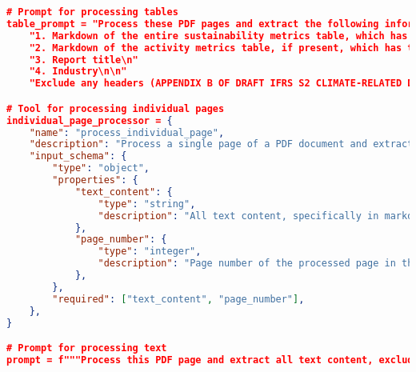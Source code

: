 \begin{appendices}
\begin{lstlisting}[language=json,firstnumber=1,label={lst:pdf_parse_prompt},caption={Schemas and prompts for PDF table and text extraction}]
# Prompt for processing tables
table_prompt = "Process these PDF pages and extract the following information:\n"
    "1. Markdown of the entire sustainability metrics table, which has these five columns: TOPIC, METRIC, CATEGORY, UNIT OF MEASURE, CODE (make sure to exclude any text that has been crossed out, but include any underlined text!)\n"
    "2. Markdown of the activity metrics table, if present, which has these four columns: ACTIVITY METRIC, CATEGORY, UNIT OF MEASURE, CODE (make sure to exclude any text that has been crossed out, but include any underlined text!). If there is no activity metrics table, omit this field.\n"
    "3. Report title\n"
    "4. Industry\n\n"
    "Exclude any headers (APPENDIX B OF DRAFT IFRS S2 CLIMATE-RELATED DISCLOSURES) or (EXPOSURE DRAFT MARCH 2022) and footers (2022 SASB, part of Value Reporting Foundation. All rights reserved.) of the pages, but include footnotes. Exclude any instances of 'continued...' or '...continued'. Exclude any text that has been crossed out, but include any underlined text. Note that tables may continue across pages. Provide the output in the specified schema."

# Tool for processing individual pages
individual_page_processor = {
    "name": "process_individual_page",
    "description": "Process a single page of a PDF document and extract specified information",
    "input_schema": {
        "type": "object",
        "properties": {
            "text_content": {
                "type": "string",
                "description": "All text content, specifically in markdown format, excluding the tables Table 1. Sustainability Disclosure Topics & Metrics and Table 2. Activity Metrics." ,
            },
            "page_number": {
                "type": "integer",
                "description": "Page number of the processed page in the footer",
            },
        },
        "required": ["text_content", "page_number"],
    },
}

# Prompt for processing text
prompt = f"""Process this PDF page and extract all text content, excluding the tables Table 1. Sustainability Disclosure Topics & Metrics and Table 2. Activity Metrics, but including any other tables that appear. Exclude any text that has been crossed out, but include any underlined text. Exclude any headers (APPENDIX B OF DRAFT IFRS S2 CLIMATE-RELATED DISCLOSURES) or (EXPOSURE DRAFT MARCH 2022) and footers (2022 SASB, part of Value Reporting Foundation. All rights reserved.) of the pages, but include footnotes. Exclude the section header titled 'Sustainability Disclosure Topics & Metrics'. Exclude subsections 'Table 1. Sustainability Disclosure Topics & Metrics' and 'Table 2. Activity Metrics'. Exclude any instances of 'continued...' or '...continued'. The report title is '{report_title}', the industry is '{industry}' (but DO NOT include the report title and industry as sections in the markdown). Provide the output in the specified schema."""


\end{lstlisting}
\end{appendices}
